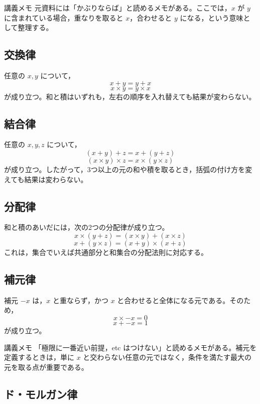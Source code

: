 \documentclass[../main.tex]{subfiles}
\begin{document}
\begin{sidebox}[TBred]{講義メモ}
  元資料には「かぶりならば」と読めるメモがある。ここでは，\(x\) が \(y\) に含まれている場合，重なりを取ると \(x\)，合わせると \(y\) になる，という意味として整理する。
\end{sidebox}

\subsection{交換律}

任意の \(x,y\) について，
\[
  x + y = y + x
\]
\[
  x \times y = y \times x
\]
が成り立つ。和と積はいずれも，左右の順序を入れ替えても結果が変わらない。

\subsection{結合律}

任意の \(x,y,z\) について，
\[
  (x+y)+z = x+(y+z)
\]
\[
  (x \times y) \times z = x \times (y \times z)
\]
が成り立つ。したがって，3つ以上の元の和や積を取るとき，括弧の付け方を変えても結果は変わらない。

\subsection{分配律}

和と積のあいだには，次の2つの分配律が成り立つ。
\[
  x \times (y+z)
  =
  (x \times y) + (x \times z)
\]
\[
  x + (y \times z)
  =
  (x+y) \times (x+z)
\]
これは，集合でいえば共通部分と和集合の分配法則に対応する。

\subsection{補元律}

補元 \(-x\) は，\(x\) と重ならず，かつ \(x\) と合わせると全体になる元である。そのため，
\[
  x \times -x = 0
\]
\[
  x + -x = 1
\]
が成り立つ。

\begin{sidebox}[TBred]{講義メモ}
  「極限に一番近い前提，etc はつけない」と読めるメモがある。補元を定義するときは，単に \(x\) と交わらない任意の元ではなく，条件を満たす最大の元を取る点が重要である。
\end{sidebox}

\subsection{ド・モルガン律}
\end{document}
